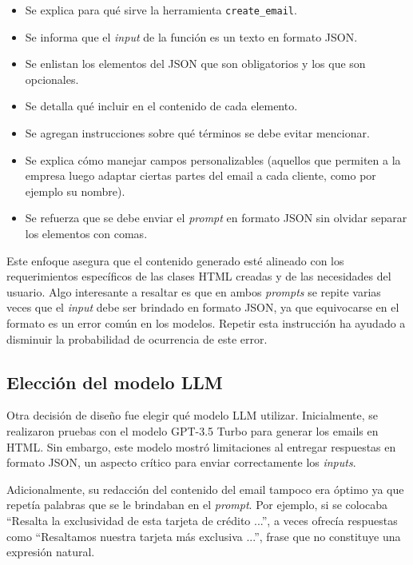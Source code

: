 \begin{itemize}
    \item Se explica para qué sirve la herramienta \texttt{create\_email}.
    \item Se informa que el \textit{input} de la función es un texto en formato JSON.
    \item Se enlistan los elementos del JSON que son obligatorios y los que son opcionales.
    \item Se detalla qué incluir en el contenido de cada elemento.
    \item Se agregan instrucciones sobre qué términos se debe evitar mencionar. 
    \item Se explica cómo manejar campos personalizables (aquellos que permiten a la empresa luego adaptar ciertas partes del email a cada cliente, como por ejemplo su nombre).
    \item Se refuerza que se debe enviar el \textit{prompt} en formato JSON sin olvidar separar los elementos con comas.
\end{itemize} 

Este enfoque asegura que el contenido generado esté alineado con los requerimientos específicos de las clases HTML creadas y de las necesidades del usuario. Algo interesante a resaltar es que en ambos \textit{prompts} se repite varias veces que el \textit{input} debe ser brindado en formato JSON, ya que equivocarse en el formato es un error común en los modelos. Repetir esta instrucción ha ayudado a disminuir la probabilidad de ocurrencia de este error.


\subsection{Elección del modelo LLM}

Otra decisión de diseño fue elegir qué modelo LLM utilizar. Inicialmente, se realizaron pruebas con el modelo GPT-3.5 Turbo para generar los emails en HTML. Sin embargo, este modelo mostró limitaciones al entregar respuestas en formato JSON, un aspecto crítico para enviar correctamente los \textit{inputs}. 

Adicionalmente, su redacción del contenido del email tampoco era óptimo ya que repetía palabras que se le brindaban en el \textit{prompt}. Por ejemplo, si se colocaba ``Resalta la exclusividad de esta tarjeta de crédito ...'', a veces ofrecía respuestas como ``Resaltamos nuestra tarjeta más exclusiva ...'', frase que no constituye una expresión natural.

